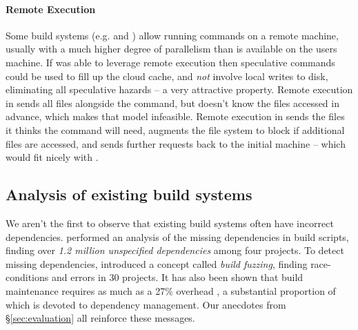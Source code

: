 \paragraph{Remote Execution} Some build systems (e.g. \Bazel and \BuildXL \cite{buildxl}) allow running commands on a remote machine, usually with a much higher degree of parallelism than is available on the users machine. If \Rattle was able to leverage remote execution then speculative commands could be used to fill up the cloud cache, and \emph{not} involve local writes to disk, eliminating all speculative hazards -- a very attractive property. Remote execution in \Bazel sends all files alongside the command, but \Rattle doesn't know the files accessed in advance, which makes that model infeasible. Remote execution in \BuildXL sends the files it thinks the command will need, augments the file system to block if additional files are accessed, and sends further requests back to the initial machine -- which would fit nicely with \Rattle.

%

\subsection{Analysis of existing build systems}

We aren't the first to observe that existing build systems often have incorrect dependencies.  \citet{bezemer2017empirical} performed an analysis of the missing dependencies in \Make build scripts, finding over \emph{1.2 million unspecified dependencies} among four projects. To detect missing dependencies, \citet{detecting_incorrect_build_rules} introduced a concept called \emph{build fuzzing}, finding race-conditions and errors in 30 projects. It has also been shown that build maintenance requires as much as a 27\% overhead \cite{build_maintenance}, a substantial proportion of which is devoted to dependency management. Our anecdotes from \S\ref{sec:evaluation} all reinforce these messages.

